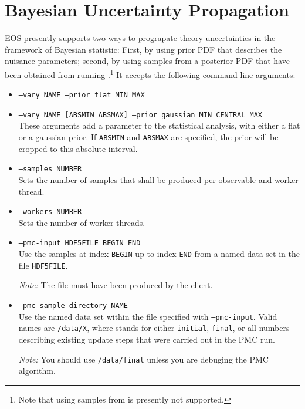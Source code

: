 \section{Bayesian Uncertainty Propagation}
\label{sec:usage:eos-propagate-uncertainty}

EOS presently supports two ways to prograpate theory uncertainties in the
framework of Bayesian statistic: First, by using prior PDF that describes
the nuisance parameters; second, by using samples from a posterior PDF that
have been obtained from running .\footnote{%
    Note that using samples from  is presently not supported.
}
It accepts the following command-line arguments:
\begin{itemize}
    \item[] \texttt{--vary NAME --prior flat MIN MAX}\\[-3\medskipamount]
    \item[] \texttt{--vary NAME [ABSMIN ABSMAX] --prior gaussian MIN CENTRAL MAX}\\[\medskipamount]
        These arguments add a parameter to the statistical analysis, with
        either a flat or a gaussian prior. If \texttt{ABSMIN} and
        \texttt{ABSMAX} are specified, the prior will be cropped to this
        absolute interval.

    \item[] \texttt{--samples NUMBER}\\[\medskipamount]
        Sets the number of samples that shall be produced per observable and
        worker thread.

    \item[] \texttt{--workers NUMBER}\\[\medskipamount]
        Sets the number of worker threads.

    \item[] \texttt{--pmc-input HDF5FILE BEGIN END}\\[\medskipamount]
        Use the samples at index \texttt{BEGIN} up to index \texttt{END} from
        a named data set in the file \texttt{HDF5FILE}.

        \emph{Note:} The file must have been produced by the
         client.
    \item[] \texttt{--pmc-sample-directory NAME}\\[\medskipamount]
        Use the named data set within the file specified with \texttt{--pmc-input}.
        Valid names are \texttt{/data/X}, where  stands for either
        \texttt{initial}, \texttt{final}, or all numbers describing existing
        update steps that were carried out in the PMC run.

        \emph{Note:} You should use \texttt{/data/final} unless you are
        debuging the PMC algorithm.
\end{itemize}

